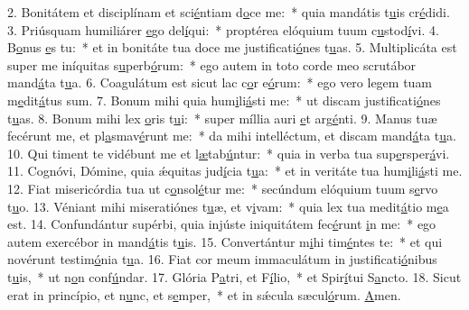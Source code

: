 2. Bonitátem et disciplínam et sci\uline{é}ntiam d\uline{o}ce me:~* quia mandátis t\uline{u}is cr\uline{é}didi.
3. Priúsquam humiliárer \uline{e}go del\uline{í}qui:~* proptérea elóquium tuum c\uline{u}stod\uline{í}vi.
4. B\uline{o}nus \uline{e}s tu:~* et in bonitáte tua doce me justificati\uline{ó}nes t\uline{u}as.
5. Multiplicáta est super me iníquitas s\uline{u}perb\uline{ó}rum:~* ego autem in toto corde meo scrutábor mand\uline{á}ta t\uline{u}a.
6. Coagulátum est sicut lac c\uline{o}r e\uline{ó}rum:~* ego vero legem tuam m\uline{e}dit\uline{á}tus sum.
7. Bonum mihi quia hum\uline{i}li\uline{á}sti me:~* ut discam justificati\uline{ó}nes t\uline{u}as.
8. Bonum mihi lex \uline{o}ris t\uline{u}i:~* super míllia auri \uline{e}t arg\uline{é}nti.
9. Manus tuæ fecérunt me, et pl\uline{a}smav\uline{é}runt me:~* da mihi intelléctum, et discam mand\uline{á}ta t\uline{u}a.
10. Qui timent te vidébunt me et l\uline{æ}tab\uline{ú}ntur:~* quia in verba tua sup\uline{e}rsper\uline{á}vi.
11. Cognóvi, Dómine, quia ǽquitas jud\uline{í}cia t\uline{u}a:~* et in veritáte tua hum\uline{i}li\uline{á}sti me.
12. Fiat misericórdia tua ut c\uline{o}nsol\uline{é}tur me:~* secúndum elóquium tuum s\uline{e}rvo t\uline{u}o.
13. Véniant mihi miseratiónes t\uline{u}æ, et v\uline{i}vam:~* quia lex tua medit\uline{á}tio m\uline{e}a est.
14. Confundántur supérbi, quia injúste iniquitátem fec\uline{é}runt \uline{i}n me:~* ego autem exercébor in mand\uline{á}tis t\uline{u}is.
15. Convertántur m\uline{i}hi tim\uline{é}ntes te:~* et qui novérunt testim\uline{ó}nia t\uline{u}a.
16. Fiat cor meum immaculátum in justificati\uline{ó}nibus t\uline{u}is,~* ut n\uline{o}n conf\uline{ú}ndar.
17. Glória P\uline{a}tri, et F\uline{í}lio,~* et Spir\uline{í}tui S\uline{a}ncto.
18. Sicut erat in princípio, et n\uline{u}nc, et s\uline{e}mper,~* et in sǽcula sæcul\uline{ó}rum. \uline{A}men.
